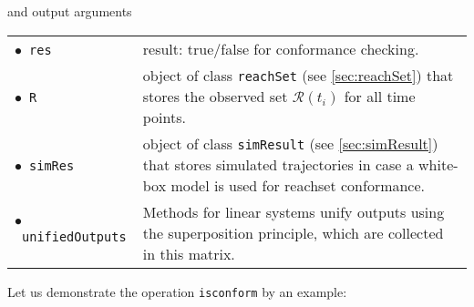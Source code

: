 and output arguments

\begin{center}
\renewcommand{\arraystretch}{1.3}
\begin{tabular}[t]{l p{13cm} }
    $\bullet$~\texttt{res} & result: true/false for conformance checking. \\
	$\bullet$~\texttt{R} & object of class \texttt{reachSet} (see \cref{sec:reachSet}) that stores the observed set $\mathcal{R}(t_i)$ for all time points. \\
	$\bullet$~\texttt{simRes} & object of class \texttt{simResult} (see \cref{sec:simResult}) that stores simulated trajectories in case a white-box model is used for reachset conformance. \\
	$\bullet$~\texttt{unifiedOutputs} & Methods for linear systems unify outputs using the superposition principle, which are collected in this matrix.
\end{tabular}
\end{center}


Let us demonstrate the operation \texttt{isconform} by an example: 

\begin{center}
\begin{minipage}[t]{\textwidth}
	\footnotesize
	
\end{minipage}
\end{center}
